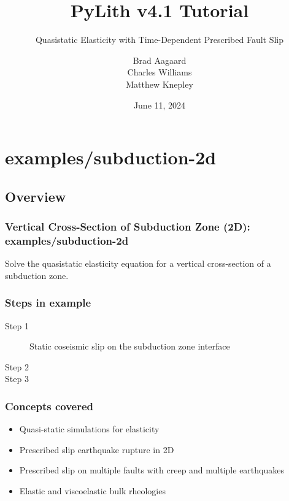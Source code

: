 \documentclass[aspectratio=169]{beamer}
\title{PyLith v4.1 Tutorial}
\subtitle{Quasistatic Elasticity with Time-Dependent Prescribed Fault Slip}
\author{Brad Aagaard\\
  Charles Williams \\
  Matthew Knepley}
\institute{\texttt{[image: ../../logos/cig\_logo\_dots]}%
  \hspace{4em}%
\raisebox{1em}{\texttt{[image: ../../logos/cig\_short\_pylith]}}}
\date{June 11, 2024}
\begin{document}
\maketitle


\section{{\ttfamily examples/subduction-2d}}

\subsection{Overview}

\begin{frame}
  \frametitle{Vertical Cross-Section of Subduction Zone (2D): {\ttfamily examples/subduction-2d}}
  \summary{}


  \vfill
  Solve the quasistatic elasticity equation for a vertical cross-section of a subduction zone.
  
\end{frame}


\begin{frame}
  \frametitle{Steps in example}
  \summary{}

  \begin{description}
    \item[Step 1] Static coseismic slip on the subduction zone interface
    \item[Step 2] 
    \item[Step 3] 
  \end{description}
  
\end{frame}


\begin{frame}
  \frametitle{Concepts covered}
  \summary{}

  \begin{itemize}
  \item Quasi-static simulations for elasticity
  \item Prescribed slip earthquake rupture in 2D
  \item Prescribed slip on multiple faults with creep and multiple earthquakes
  \item Elastic and viscoelastic bulk rheologies
  \end{itemize}
  
\end{frame}
\end{document}
